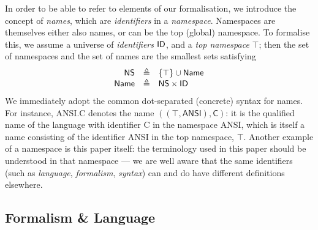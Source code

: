 \begin{newdef}
In order to be able to refer to elements of our formalisation, we introduce the concept of \emph{names}, which are \emph{identifiers} in a \emph{namespace}. Namespaces are themselves either also names, or can be the top (global) namespace. To formalise this, we assume a universe of \emph{identifiers} $\mathsf{ID}$, and a \emph{top namespace} $\top$; then the set of namespaces \NS and the set of names \Name are the smallest sets satisfying
\[\begin{array}{rcl}
\mathsf{NS} & \triangleq & \{\top\} \cup \mathsf{Name} \\
\mathsf{Name} & \triangleq & \mathsf{NS} \times \mathsf{ID}
\end{array}\]
We immediately adopt the common dot-separated (concrete) syntax for names.
For instance, \textsf{ANSI.C} denotes the name $((\top,\mathsf{ANSI}), \mathsf{C})$: it is the qualified name of the language with identifier \textsf{C} in the namespace \textsf{ANSI}, which is itself a name consisting of the identifier \textsf{ANSI} in the top namespace, $\top$. Another example of a namespace is this paper itself: the terminology used in this paper should be understood in that namespace --- we are well aware that the same identifiers (such as \textit{language}, \textit{formalism}, \textit{syntax}) can and do have different definitions elsewhere.
\end{newdef}

\subsection{Formalism \& Language}
\label{sec:Formalism-Language}

